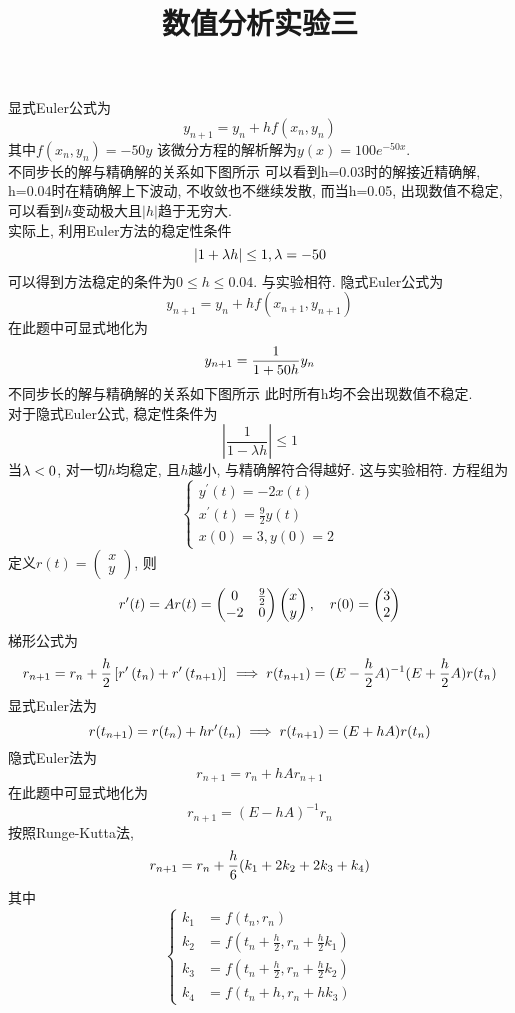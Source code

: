 \documentclass[UTF8,9pt]{ctexart}
\title{数值分析实验三}
\begin{document}
 
\maketitle
{}
显式Euler公式为$$ 
y_{n+1}=y_{n}+h f\left(x_{n}, y_{n}\right)
 $$
其中$f(x_n,y_n) = -50y$
该微分方程的解析解为$y(x)=100e^{-50x}$. \\
不同步长的解与精确解的关系如下图所示
可以看到h=0.03时的解接近精确解, h=0.04时在精确解上下波动, 不收敛也不继续发散, 而当h=0.05, 出现数值不稳定, 可以看到$h$变动极大且$|h|$趋于无穷大. \\
实际上, 利用Euler方法的稳定性条件$$ 
|1+\lambda h| \leq 1, \lambda = -50
 $$可以得到方法稳定的条件为$0\leq h \leq 0.04$. 与实验相符.
隐式Euler公式为$$ 
y_{n+1}=y_{n}+h f\left(x_{n+1}, y_{n+1}\right)
 $$
在此题中可显式地化为$$y_{n+1}=\frac{1}{1+50h}y_n$$
不同步长的解与精确解的关系如下图所示
此时所有h均不会出现数值不稳定. \\
对于隐式Euler公式, 稳定性条件为$$ 
\left|\frac{1}{1-\lambda h}\right| \leq 1
 $$当$\lambda<0$, 对一切$h$均稳定, 且$h$越小, 与精确解符合得越好. 这与实验相符.
方程组为$$ 
\left\{\begin{array}{l}{y^{\prime}(t)=-2 x(t)} \\ {x^{\prime}(t)=\frac{9}{2} y(t)} \\ {x(0)=3, y(0)=2}\end{array}\right.
 $$
定义$r(t) = \begin{pmatrix}x\\y \end{pmatrix}$, 则
$$r'(t) = Ar(t) = \begin{pmatrix}0&\frac{9}{2}\\-2&0 \end{pmatrix}\begin{pmatrix}x\\y \end{pmatrix},\quad r(0) = \begin{pmatrix}3\\2 \end{pmatrix}$$
梯形公式为$$ 
r_{n+1}=r_{n}+\frac{h}{2}\left[r'\left(t_{n}\right)+r'\left(t_{n+1})\right]\right. \implies r(t_{n+1})=(E-\frac{h}{2}A)^{-1}(E+\frac{h}{2}A)r(t_n)
 $$
显式Euler法为
$$r(t_{n+1}) = r(t_n)+hr'(t_n) \implies r(t_{n+1}) = (E+hA)r(t_n)$$
隐式Euler法为$$ 
r_{n+1}=r_{n}+hAr_{n+1}
 $$
在此题中可显式地化为$$r_{n+1}=(E-hA)^{-1}r_n$$
按照Runge-Kutta法,
$$r_{{n+1}}=r_{n}+{h \over 6}(k_{1}+2k_{2}+2k_{3}+k_{4})$$
其中
$$ \left\{
\begin{aligned} 
k_{1} &=f\left(t_{n}, r_{n}\right) \\ k_{2} &=f\left(t_{n}+\frac{h}{2}, r_{n}+\frac{h}{2} k_{1}\right) \\ k_{3} &=f\left(t_{n}+\frac{h}{2}, r_{n}+\frac{h}{2} k_{2}\right) \\ k_{4} &=f\left(t_{n}+h, r_{n}+h k_{3}\right) \end{aligned}\right.
 $$
\end{document}
